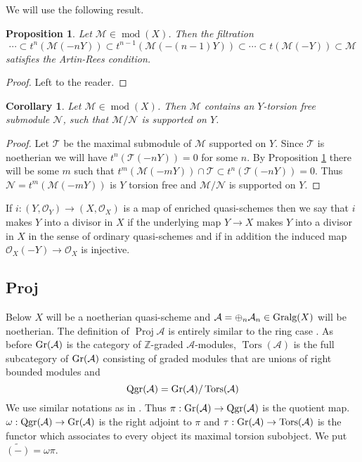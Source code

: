 \documentclass{amsproc}
\def \ZZ{{\mathbb Z}}
\def\Ascr{{\mathcal A}}
\def\Mscr{{\mathcal M}}
\def\Nscr{{\mathcal N}}
\def\Oscr{{\mathcal O}}
\def\Tscr{{\mathcal T}}
\def\Gr{\mathop{\text{Gr}}}
\def\Gralg{\mathop{\text{Gralg}}}
\def\Tors{\operatorname{Tors}}
\def\coh{\operatorname {mod}}
\def\Proj{\operatorname {Proj}}
\def\Qgr{\operatorname {Qgr}}
\def\Tors{\operatorname {Tors}}
\def\r{\rightarrow}
\let\oldtext\text
\def\text#1{\oldtext{\upshape #1}}
\newtheorem{propositions}[lemmas]{Proposition}
\newtheorem{corollarys}[lemmas]{Corollary}
\theoremstyle{definition}
\theoremstyle{remark}
\numberwithin{equation}{section}
\numberwithin{table}{section}
\numberwithin{figure}{section}
\def\Gr{\mathop{\text{Gr}}}
\begin{document}
 We will use the following result.
\begin{propositions} 
\label{ref:3.7.2a}
Let $\Mscr\in \coh(X)$. Then the filtration
\[
\cdots \subset t^n(\Mscr(-nY))\subset t^{n-1}(\Mscr(-(n-1)Y))\subset \cdots\subset
t(\Mscr(-Y))\subset
\Mscr
\]
satisfies the Artin-Rees condition.
\end{propositions}
\begin{proof}
Left to the reader.
\end{proof}
\begin{corollarys}
\label{ref:3.7.3a}
Let $\Mscr\in\coh(X)$. Then $\Mscr$ contains
an $Y$-torsion free submodule $\Nscr$, such that $\Mscr/\Nscr$ is
supported on $Y$.
\end{corollarys}
\begin{proof}
  Let $\Tscr$ be the maximal submodule of $\Mscr$ supported on $Y$.
  Since $\Tscr$ is noetherian we will have $t^n(\Tscr(-nY))=0$ for
  some $n$. By
  Proposition \ref{ref:3.7.2a} there will be some $m$ such that
  $t^m(\Mscr(-mY))\cap \Tscr\subset t^n(\Tscr(-nY))=0$.  Thus
  $\Nscr=t^m(\Mscr(-mY))$ is $Y$ torsion free and $\Mscr/\Nscr$ is
  supported on $Y$.
\end{proof}
If $i:(Y,\Oscr_Y)\r (X,\Oscr_X)$ is a map of enriched quasi-schemes
then we say that $i$ makes $Y$ into a divisor in $X$ if the underlying
map $Y\r X$ makes $Y$ into a divisor in $X$ in the sense of ordinary
quasi-schemes and if in addition the induced map $\Oscr_X(-Y)\r
\Oscr_X$ is injective.


















\subsection{Proj}
\label{ref:3.8b}
Below $X$ will be a  noetherian quasi-scheme and
  $\Ascr=\oplus_n\Ascr_n\in \Gralg(X)$ will be noetherian.
The definition of $\Proj \Ascr$ is entirely similar to the
ring case \cite{AZ}. As before $\Gr(\Ascr)$ is the
category of $\ZZ$-graded $\Ascr$-modules, $\Tors(\Ascr)$ is the full
subcategory of $\Gr(\Ascr)$ consisting of graded modules that are unions of
right bounded modules and
\[
\Qgr(\Ascr)=\Gr(\Ascr)/\Tors(\Ascr)
\]
We use similar notations as in \cite{AZ}. Thus $\pi:\Gr(\Ascr)\r
\Qgr(\Ascr)$ is the quotient map. $\omega:\Qgr(\Ascr)\r \Gr(\Ascr)$ is
the right adjoint to $\pi$  and $\tau:\Gr(\Ascr)\r \Tors(\Ascr)$ is the
functor which associates to every object its maximal torsion
subobject. We put
$\tilde{(-)}=\omega\pi$.
\end{document}
